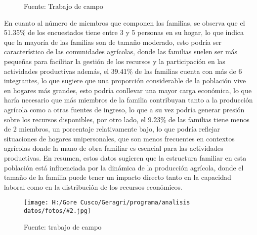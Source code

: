 \documentclass{article}\usepackage[]{graphicx}\usepackage[table]{xcolor}
\makeatletter
\newenvironment{kframe}{%
 \def\at@end@of@kframe{}%
 \ifinner\ifhmode%
  \def\at@end@of@kframe{\end{minipage}}%
  \begin{minipage}{\columnwidth}%
 \fi\fi%
 \def\FrameCommand##1{\hskip\@totalleftmargin \hskip-\fboxsep
 \colorbox{shadecolor}{##1}\hskip-\fboxsep
     \hskip-\linewidth \hskip-\@totalleftmargin \hskip\columnwidth}%
 \MakeFramed {\advance\hsize-\width
   \@totalleftmargin\z@ \linewidth\hsize
   \@setminipage}}%
 {\par\unskip\endMakeFramed%
 \at@end@of@kframe}
\newenvironment{knitrout}{}{} %
\newenvironment{fotos}[2]
{\begin{figure}[H]
	\centering
	\caption{#1}
	\texttt{[image: H:/Gore Cusco/Geragri/programa/analisis datos/fotos/\#2.jpg]}
	\caption*{Fuente: trabajo de campo}}
{\end{figure}}
\makeatother
\begin{document}
\begin{figure}[H]
  \centering
  \caption{Numero de integrantes que conforman su familia}
\begin{knitrout}
\color{fgcolor}\begin{kframe}


{\ttfamily\noindent\bfseries{}}

{\ttfamily\noindent{}}

{\ttfamily\noindent\bfseries{}}

{\ttfamily\noindent\bfseries\color{errorcolor}{\#\# Error: objeto 'datos' no encontrado}}

{\ttfamily\noindent\bfseries\color{errorcolor}{\#\# Error: objeto 'datos' no encontrado}}

{\ttfamily\noindent\bfseries\color{errorcolor}{\#\# Error: objeto 'datos' no encontrado}}

{\ttfamily\noindent\bfseries\color{errorcolor}{\#\# Error: objeto 'graph1' no encontrado}}\end{kframe}
\end{knitrout}
  \caption*{Fuente: Trabajo de campo}
\end{figure}
En cuanto al número de miembros que componen las familias, se observa que el 51.35\% de los encuestados tiene entre 3 y 5 personas en su hogar, lo que indica que la mayoría de las familias son de tamaño moderado, esto podría ser característico de las comunidades agrícolas, donde las familias suelen ser más pequeñas para facilitar la gestión de los recursos y la participación en las actividades productivas además, el 39.41\% de las familias cuenta con más de 6 integrantes, lo que sugiere que una proporción considerable de la población vive en hogares más grandes, esto podría conllevar una mayor carga económica, lo que haría necesario que más miembros de la familia contribuyan tanto a la producción agrícola como a otras fuentes de ingreso, lo que a su vez podría generar presión sobre los recursos disponibles, por otro lado, el 9.23\% de las familias tiene menos de 2 miembros, un porcentaje relativamente bajo, lo que podría reflejar situaciones de hogares unipersonales, que son menos frecuentes en contextos agrícolas donde la mano de obra familiar es esencial para las actividades productivas. En resumen, estos datos sugieren que la estructura familiar en esta población está influenciada por la dinámica de la producción agrícola, donde el tamaño de la familia puede tener un impacto directo tanto en la capacidad laboral como en la distribución de los recursos económicos.
\begin{fotos}
{Aplicacion de encuestas en el area de influencia}{5}
\end{fotos}
\end{document}
